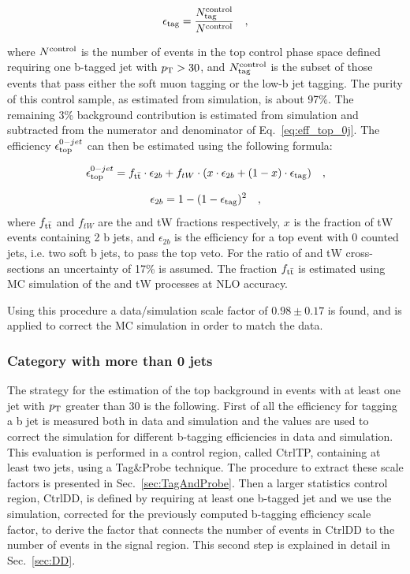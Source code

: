 \begin{equation}\label{eq:eff_top_0j}
\epsilon_{\rm tag} = \frac{N_{\rm tag}^{\rm control}}{N^{\rm control}} \quad ,
\end{equation}

where $N^{\rm control}$ is the number of events in the top control phase space defined requiring one b-tagged jet with $p_\mathrm{T}>30$\GeV, and $N_{\rm tag}^{\rm control}$ is the subset of those events that pass either the soft muon tagging or the low-\pt b jet tagging. The purity of this control sample, as estimated from simulation, is about 97\%. The remaining 3\% background contribution is estimated from simulation and subtracted from the numerator and denominator of Eq.~\eqref{eq:eff_top_0j}. The efficiency $\epsilon_{\rm top}^{0-jet}$ can then be estimated using the following formula:

\begin{equation}\label{eq:eff_top_0j}
\epsilon_{\rm top}^{0-jet} = f_{\mathrm{t}\bar{\mathrm{t}}} \cdot \epsilon_{2b} + f_{tW} \cdot ( x \cdot \epsilon_{2b} + (1-x) \cdot \epsilon_{\rm tag} ) \quad ,
\end{equation}

\begin{equation}
\epsilon_{2b} = 1 - (1 - \epsilon_{\rm tag})^{2} \quad ,
\end{equation}
where $f_{\mathrm{t}\bar{\mathrm{t}}}$ and $f_{tW}$ are the \ttbar and tW fractions respectively, $x$ is the fraction of tW events containing 2 b jets, and $\epsilon_{2b}$ is the efficiency for a top event with 0 counted jets, i.e. two soft b jets, to pass the top veto. For the ratio of \ttbar and tW cross-sections an uncertainty of 17\% is assumed. The fraction $f_{\mathrm{t}\bar{\mathrm{t}}}$ is estimated using MC simulation of the \ttbar and tW processes at NLO accuracy.

Using this procedure a data/simulation scale factor of $0.98 \pm 0.17$ is found, and is applied to correct the MC simulation in order to match the data.



\subsubsection{Category with more than 0 jets}
The strategy for the estimation of the top background in events with at least one jet with $p_\mathrm{T}$ greater than 30 \GeV is the following. First of all the efficiency for tagging a b jet is measured both in data and simulation and the values are used to correct the simulation for different b-tagging efficiencies in data and simulation. This evaluation is performed in a control region, called CtrlTP, containing at least two jets, using a Tag\&Probe technique. The procedure to extract these scale factors is presented in Sec.~\ref{sec:TagAndProbe}. Then a larger statistics control region, CtrlDD, is defined by requiring at least one b-tagged jet and we use the simulation, corrected for the previously computed b-tagging efficiency scale factor, to derive the factor that connects the number of events in CtrlDD to the number of events in the signal region. This second step is explained in detail in Sec.~\ref{sec:DD}. 

